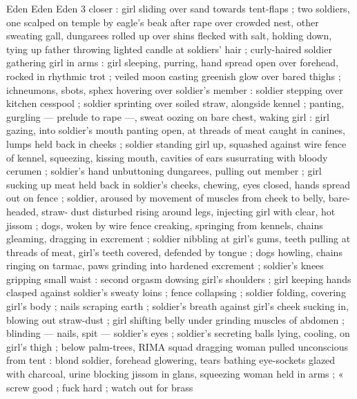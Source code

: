 Eden Eden Eden 3
closer : girl sliding over sand towards tent-flaps ; two soldiers, one
scalped on temple by eagle's beak after rape over crowded nest,
other sweating gall, dungarees rolled up over shins flecked with salt,
holding down, tying up father throwing lighted candle at soldiers’
hair ; curly-haired soldier gathering girl in arms : girl sleeping,
purring, hand spread open over forehead, rocked in rhythmic trot ;
veiled moon casting greenish glow over bared thighs ; ichneumons,
sbots, sphex hovering over soldier's member : soldier stepping over
kitchen cesspool ; soldier sprinting over soiled straw, alongside
kennel ; panting, gurgling — prelude to rape —, sweat oozing on
bare chest, waking girl : girl gazing, into soldier's mouth panting
open, at threads of meat caught in canines, lumps held back in
cheeks ; soldier standing girl up, squashed against wire fence of
kennel, squeezing, kissing mouth, cavities of ears susurrating with
bloody cerumen ; soldier's hand unbuttoning dungarees, pulling out
member ; girl sucking up meat held back in soldier's cheeks,
chewing, eyes closed, hands spread out on fence ; soldier, aroused
by movement of muscles from cheek to belly, bare-headed, straw-
dust disturbed rising around legs, injecting girl with clear, hot jissom
; dogs, woken by wire fence creaking, springing from kennels, chains
gleaming, dragging in excrement ; soldier nibbling at girl's gums,
teeth pulling at threads of meat, girl's teeth covered, defended by
tongue ; dogs howling, chains ringing on tarmac, paws grinding into
hardened excrement ; soldier's knees gripping small waist : second
orgasm dowsing girl's shoulders ; girl keeping hands clasped against
soldier's sweaty loins ; fence collapsing ; soldier folding, covering
girl’s body ; nails scraping earth ; soldier's breath against girl's
cheek sucking in, blowing out straw-dust ; girl shifting belly under
grinding muscles of abdomen ; blinding — nails, spit — soldier's
eyes ; soldier's secreting balls lying, cooling, on girl's thigh ; below
palm-trees, RIMA squad dragging woman pulled unconscious from
tent : blond soldier, forehead glowering, tears bathing eye-sockets
glazed with charcoal, urine blocking jissom in glans, squeezing
woman held in arms ; « screw good ; fuck hard ; watch out for brass

